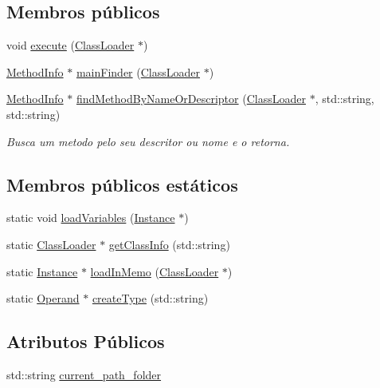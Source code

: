\subsection*{Membros públicos}
\begin{DoxyCompactItemize}
\item 
void \hyperlink{class_interpreter_aaa34fcc8ece810597cd2fea359b65220}{execute} (\hyperlink{class_class_loader}{Class\+Loader} $\ast$)
\item 
\hyperlink{struct_method_info}{Method\+Info} $\ast$ \hyperlink{class_interpreter_a9be1f0faf7df7c81dc180da22ea08fa5}{main\+Finder} (\hyperlink{class_class_loader}{Class\+Loader} $\ast$)
\item 
\hyperlink{struct_method_info}{Method\+Info} $\ast$ \hyperlink{class_interpreter_a16752843b70549dac6ed661365e95ae3}{find\+Method\+By\+Name\+Or\+Descriptor} (\hyperlink{class_class_loader}{Class\+Loader} $\ast$, std\+::string, std\+::string)
\begin{DoxyCompactList}\small\item\em Busca um metodo pelo seu descritor ou nome e o retorna. \end{DoxyCompactList}\end{DoxyCompactItemize}
\subsection*{Membros públicos estáticos}
\begin{DoxyCompactItemize}
\item 
static void \hyperlink{class_interpreter_a39a3745e54aa3cee8882075c96ae8b3f}{load\+Variables} (\hyperlink{struct_instance}{Instance} $\ast$)
\item 
static \hyperlink{class_class_loader}{Class\+Loader} $\ast$ \hyperlink{class_interpreter_a99a623bb05c66632d0ab034ebaf2cf51}{get\+Class\+Info} (std\+::string)
\item 
static \hyperlink{struct_instance}{Instance} $\ast$ \hyperlink{class_interpreter_ab8fa17a7a73d119f3a3113555aef9702}{load\+In\+Memo} (\hyperlink{class_class_loader}{Class\+Loader} $\ast$)
\item 
static \hyperlink{struct_operand}{Operand} $\ast$ \hyperlink{class_interpreter_a8ff3509dcc0f48200724b8ae04467495}{create\+Type} (std\+::string)
\end{DoxyCompactItemize}
\subsection*{Atributos Públicos}
\begin{DoxyCompactItemize}
\item 
std\+::string \hyperlink{class_interpreter_aba201f836cc30ebda2cdab362e00a145}{current\+\_\+path\+\_\+folder}
\end{DoxyCompactItemize}
